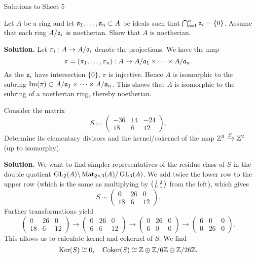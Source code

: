 \documentclass[a4paper,11pt]{article}
\begin{document}
\begin{center}
    \huge{Solutions to Sheet 5}
\end{center}

Let $A$ be a ring and let $\mathfrak{a}_1, \dots, \mathfrak{a}_n \subset A$ be ideals such
that $\bigcap_{i=1}^n \mathfrak{a}_i = \{0\}$. Assume that each ring 
$A / \mathfrak{a}_i$ is noetherian. Show that $A$ is noetherian. 

\textbf{Solution.}
Let $\pi_i : A \to A / \mathfrak{a}_i$ denote the projections. We have the map 
\begin{equation*}
 \pi = (\pi_1, \dots, \pi_n): A \to A/\mathfrak{a}_1 \times \dots \times A/\mathfrak{a}_n.
\end{equation*}
As the $\mathfrak{a}_i$ have intersection $\{0\}$, $\pi$ is injective. Hence $A$ is isomorphic
to the subring $\operatorname{Im}(\pi) \subset A/\mathfrak{a}_1 \times \dots \times A/\mathfrak{a}_n$. This 
shows that $A$ is isomorphic to the subring of a noetherian ring, thereby
noetherian.

Consider the matrix
\begin{equation*}
    S \coloneqq \begin{pmatrix}
        -36 & 14 & -24 \\
        18 & 6 & 12
    \end{pmatrix}.
\end{equation*}
Determine its elementary divisors and the kernel/cokernel of the map
$\mathbb{Z}^3 \xrightarrow{S} \mathbb{Z}^2$ (up to isomorphy).

\textbf{Solution.}  
We want to find simpler representatives of the residue class of $S$ in the double
quotient $\operatorname{GL}_2(A) \backslash \operatorname{Mat}_{2 \times 3}(A) / \operatorname{GL}_3(A)$. We add twice
the lower row to the upper row (which is the same as multiplying by $\big(\begin{smallmatrix} 1 & 2\\ 0 & 1 \end{smallmatrix}\big)$ 
from the left), which gives
\begin{equation*}
    S \sim \begin{pmatrix}
        0 & 26 & 0 \\
        18 & 6 & 12
    \end{pmatrix}.
\end{equation*}
Further transformations yield
\begin{equation*}
    \begin{pmatrix}
        0 & 26 & 0 \\
        18 & 6 & 12
    \end{pmatrix}
    \to 
    \begin{pmatrix}
        0 & 26 & 0 \\
        6 & 6 & 12
    \end{pmatrix}
    \to
    \begin{pmatrix}
        0 & 26 & 0 \\
        6 & 0 & 0
    \end{pmatrix}
    \to 
\begin{pmatrix}
        6 & 0 & 0 \\
        0 & 26 & 0
    \end{pmatrix}.
\end{equation*}
This allows us to calculate kernel and cokernel of $S$. We find
\begin{equation*}
    \operatorname{Ker}(S) \cong 0, \quad \operatorname{Coker}(S) \cong \mathbb{Z} \oplus \mathbb{Z}/6\mathbb{Z} \oplus \mathbb{Z}/26\mathbb{Z}.
\end{equation*}
\end{document}
